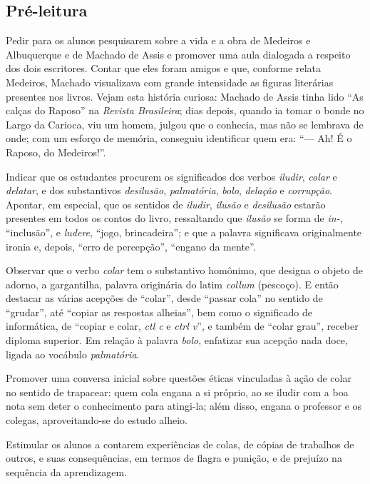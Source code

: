 \subsection{Pré-leitura}

Pedir para os alunos pesquisarem sobre a vida e a obra de Medeiros e
Albuquerque e de Machado de Assis e promover uma aula dialogada a
respeito dos dois escritores. Contar que eles foram amigos e que,
conforme relata Medeiros, Machado visualizava com grande intensidade as
figuras literárias presentes nos livros. Vejam esta história curiosa:
Machado de Assis tinha lido ``As calças do Raposo'' na \emph{Revista
Brasileira}; dias depois, quando ia tomar o bonde no Largo da Carioca,
viu um homem, julgou que o conhecia, mas não se lembrava de onde; com um
esforço de memória, conseguiu identificar quem era: ``--- Ah! É o
Raposo, do Medeiros!''.

Indicar que os estudantes procurem os significados dos verbos
\emph{iludir}, \emph{colar} e \emph{delatar}, e dos substantivos
\emph{desilusão}, \emph{palmatória}, \emph{bolo}, \emph{delação} e
\emph{corrupção}. Apontar, em especial, que os sentidos de
\emph{iludir}, \emph{ilusão} e \emph{desilusão} estarão presentes em
todos os contos do livro, ressaltando que \emph{ilusão} se forma de
\emph{in-}, ``inclusão'', e \emph{ludere}, ``jogo, brincadeira''; e que
a palavra significava originalmente ironia e, depois, ``erro de
percepção'', ``engano da mente''.

Observar que o verbo \emph{colar} tem o substantivo homônimo, que
designa o objeto de adorno, a gargantilha, palavra originária do latim
\emph{collum} (pescoço). E então destacar as várias acepções de
``colar'', desde ``passar cola'' no sentido de ``grudar'', até ``copiar
as respostas alheias'', bem como o significado de informática, de
``copiar e colar, \emph{ctl c} e \emph{ctrl v}'', e também de ``colar
grau'', receber diploma superior. Em relação à palavra \emph{bolo},
enfatizar sua acepção nada doce, ligada ao vocábulo \emph{palmatória}.

Promover uma conversa inicial sobre questões éticas vinculadas à ação de
colar no sentido de trapacear: quem cola engana a si próprio, ao se
iludir com a boa nota sem deter o conhecimento para atingi-la; além
disso, engana o professor e os colegas, aproveitando-se do estudo
alheio.

Estimular os alunos a contarem experiências de colas, de cópias de
trabalhos de outros, e suas consequências, em termos de flagra e
punição, e de prejuízo na sequência da aprendizagem.

